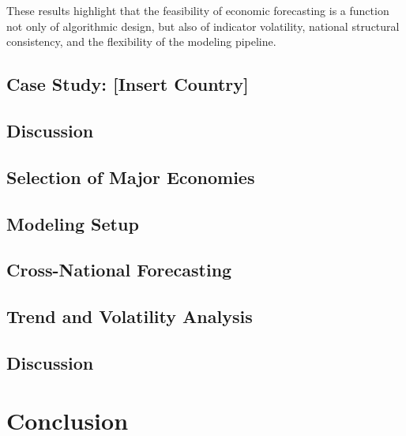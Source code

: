 \documentclass[12pt]{article}
\begin{document}
These results highlight that the feasibility of economic forecasting is a function not only of algorithmic design, but also of indicator volatility, national structural consistency, and the flexibility of the modeling pipeline.

\subsection{Case Study: [Insert Country]}

\subsection{Discussion}

\subsection{Selection of Major Economies}

\subsection{Modeling Setup}

\subsection{Cross-National Forecasting}

\subsection{Trend and Volatility Analysis}

\subsection{Discussion}

\section{Conclusion}
\end{document}
